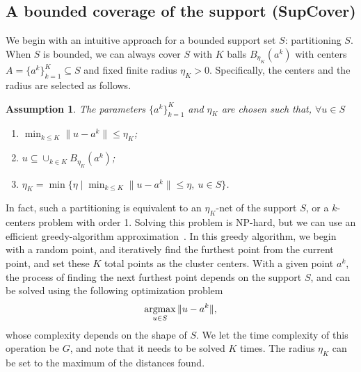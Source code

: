 \documentclass[12pt]{article}
\newcommand{\supp}{S}
\newcommand{\unc}{u}
\newcommand{\argmax}{\mathop{\rm argmax}}
\newtheorem{assumption}{Assumption}[section]
\begin{document}
\subsection{A bounded coverage of the support (SupCover)}
\label{sec:cover_sup}
We begin with an intuitive approach for a bounded support set $\supp$: partitioning $\supp$. 
When $\supp$ is bounded, we can always cover $\supp$ with $K$ balls $B_{\eta_K}(a^k)$ with centers $A = \{a^k\}_{k=1}^K \subseteq S$ and fixed finite radius $\eta_K > 0$. Specifically, the centers and the radius are selected as follows.
\begin{assumption}\label{ass:balls}
The parameters $\{a^k\}_{k=1}^K$ and $\eta_K$ are chosen such that, $\forall u \in S$
\begin{enumerate}
\item $\min_{k\leq K}\|\unc - a^k\| \leq \eta_K$;
\item $\unc \subseteq \cup_{k \in K} B_{\eta_K}(a^k)$;
\item $\eta_K = \min\{\eta \mid \min_{k\leq K}\|\unc - a^k\| \leq \eta,~u \in \supp\}$.
\end{enumerate}
\end{assumption}
In fact, such a partitioning is equivalent to an $\eta_K$-net of the support $S$, or a $k$-centers problem with order 1. 
Solving this problem is NP-hard, but we can use an efficient greedy-algorithm approximation~\cite{kcenters}.
In this greedy algorithm, we begin with a random point, and iteratively find the furthest point from the current point, and set these $K$ total points as the cluster centers. With a given point $a^k$, the process of finding the next furthest point depends on the support $S$, and can be solved using the following optimization problem
$$ \argmax_{u\in \supp}\|u-a^k\|,$$ whose complexity depends on the shape of $\supp$. We let the time complexity of this operation be $G$, and note that it needs to be solved $K$ times. The radius $\eta_K$ can be set to the maximum of the distances found. 
\end{document}
